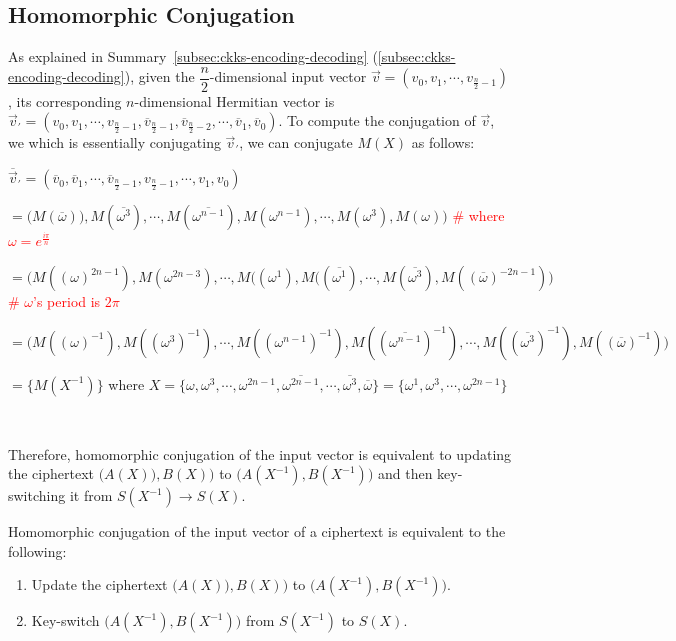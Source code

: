 \subsection{Homomorphic Conjugation}
\label{subsec:ckks-conjugation}


As explained in Summary~\ref*{subsec:ckks-encoding-decoding} (\autoref{subsec:ckks-encoding-decoding}), given the $\dfrac{n}{2}$-dimensional input vector $\vec{v} = (v_0, v_1, \cdots, v_{\frac{n}{2}-1})$, its corresponding $n$-dimensional Hermitian vector is $\vec{v}_{'} = (v_0, v_1, \cdots, v_{\frac{n}{2}-1}, \overline{v}_{\frac{n}{2}-1}, \overline{v}_{\frac{n}{2}-2}, \cdots, \overline{v}_1, \overline{v}_0)$. To compute the conjugation of $\vec{v}$, we which is essentially conjugating $\vec{v}_{'}$, we can conjugate $M(X)$ as follows:

$\overline{\vec{v}}_{'} = (\overline{v}_0, \overline{v}_1, \cdots, \overline{v}_{\frac{n}{2}-1}, {v}_{\frac{n}{2}-1}, \cdots, {v}_1, {v}_0)$

$= \bm{(}M(\overline{\omega})), M(\overline{\omega^{3}}), \cdots, M(\overline{\omega^{n-1}}), M(\omega^{n-1}), \cdots, M(\omega^{3}), M(\omega)\bm{)}$ \textcolor{red}{ \# where $\omega = e^{\frac{i\pi}{n}}$}

$= \bm{(}M((\omega)^{2n-1}), M(\omega^{2n-3}), \cdots, M((\omega^{1}), M((\overline{\omega^{1}}), \cdots, M(\overline{\omega^{3}}), M((\overline{\omega})^{-2n-1})\bm{)}$
\textcolor{red}{ \# $\omega$'s period is $2\pi$}

$= \bm{(}M((\omega)^{-1}), M((\omega^{3})^{-1}), \cdots, M((\omega^{n-1})^{-1}), M((\overline{\omega^{n-1}})^{-1}), \cdots, M((\overline{\omega^{3}})^{-1}), M((\overline{\omega})^{-1})\bm{)}$

$=\{M(X^{-1})\}$ where $X = \{\omega, \omega^{3}, \cdots, \omega^{2n - 1}, \overline{\omega^{2n - 1}}, \cdots, \overline{\omega^3}, \overline{\omega} \} = \{\omega^{1}, \omega^{3}, \cdots, \omega^{2n - 1}\}$

$ $

Therefore, homomorphic conjugation of the input vector is equivalent to updating the ciphertext $\bm{(}A(X)), B(X)\bm{)}$ to $\bm{(}A(X^{-1}), B(X^{-1})\bm{)}$ and then key-switching it from $S(X^{-1}) \rightarrow S(X)$. 


\begin{tcolorbox}[title={\textbf{\tboxlabel{\ref*{subsec:ckks-conjugation}} CKKS's Homomorphic Conjugation}}]

Homomorphic conjugation of the input vector of a ciphertext is equivalent to the following:

\begin{enumerate}
\item Update the ciphertext $\bm{(}A(X)), B(X)\bm{)}$ to $\bm{(}A(X^{-1}), B(X^{-1})\bm{)}$.
\item Key-switch $\bm{(}A(X^{-1}), B(X^{-1})\bm{)}$ from $S(X^{-1})$ to $S(X)$.

\end{enumerate}

\end{tcolorbox}

